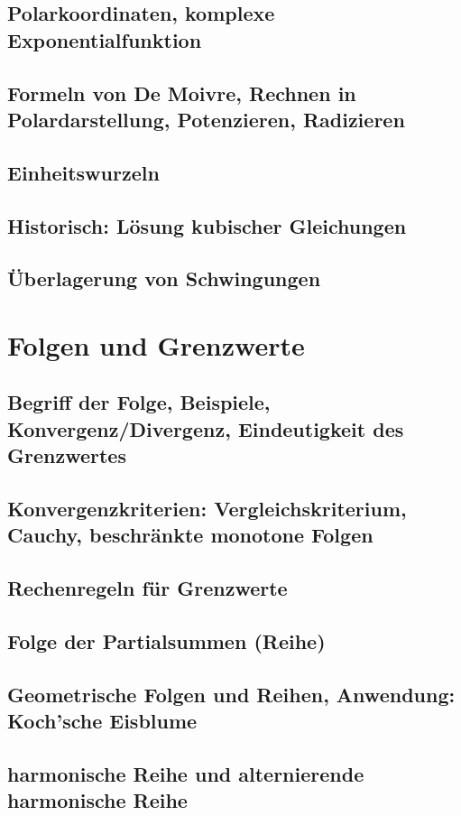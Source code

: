\subsection{Polarkoordinaten, komplexe Exponentialfunktion}
\subsection{Formeln von De Moivre, Rechnen in Polardarstellung, Potenzieren, Radizieren}
\subsection{Einheitswurzeln}
\subsection{Historisch: Lösung kubischer Gleichungen}
\subsection{Überlagerung von Schwingungen}

\section{Folgen und Grenzwerte}
\subsection{Begriff der Folge, Beispiele, Konvergenz/Divergenz, Eindeutigkeit des Grenzwertes}
\subsection{Konvergenzkriterien: Vergleichskriterium, Cauchy, beschränkte monotone Folgen}
\subsection{Rechenregeln für Grenzwerte}
\subsection{Folge der Partialsummen (Reihe)}
\subsection{Geometrische Folgen und Reihen, Anwendung: Koch’sche Eisblume}
\subsection{harmonische Reihe und alternierende harmonische Reihe}
